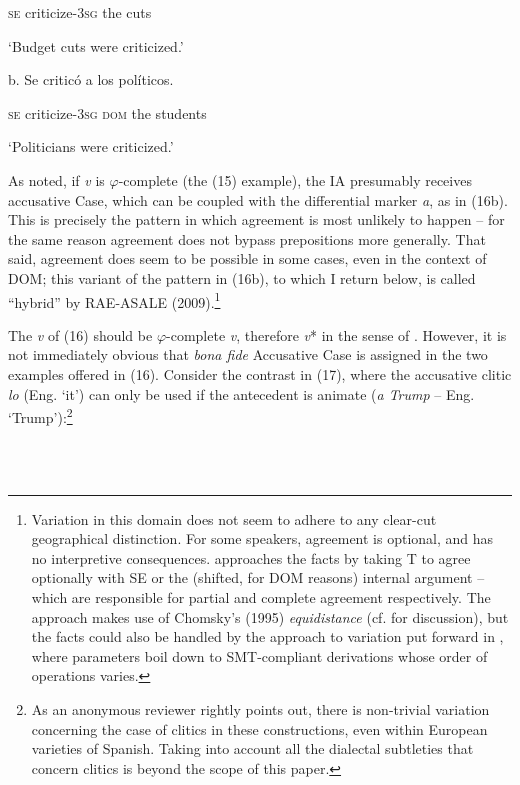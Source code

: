 \documentclass[output=paper]{langsci/langscibook}
\begin{document}
        \textsc{se} criticize\textsc{{}-3sg}  the  cuts

                 ‘Budget cuts were criticized.’

  b.   Se  criticó             a        los  políticos.             

      \textsc{se} criticize\textsc{{}-3sg  dom} the students

      ‘Politicians were criticized.’

As noted, if \textit{v} is $\varphi $-complete (the (15) example), the IA presumably receives accusative Case, which can be coupled with the differential marker \textit{a}, as in (16b). This is precisely the pattern in which agreement is most unlikely to happen – for the same reason agreement does not bypass prepositions more generally. That said, agreement does seem to be possible in some cases, even in the context of DOM; this variant of the pattern in (16b), to which I return below, is called “hybrid” by RAE-ASALE (2009).\footnote{Variation in this domain does not seem to adhere to any clear-cut geographical distinction. For some speakers, agreement is optional, and has no interpretive consequences. \citet{Planells2017} approaches the facts by taking T to agree optionally with SE or the (shifted, for DOM reasons) internal argument – which are responsible for partial and complete agreement respectively. The approach makes use of Chomsky’s (1995) \textit{equidistance} (cf. \citealt{Gallego2013} for discussion), but the facts could also be handled by the approach to variation put forward in \citet{Obata2016}, where parameters boil down to SMT-compliant derivations whose order of operations varies.}

  The \textit{v} of (16) should be $\varphi $-complete \textit{v}, therefore \textit{v}* in the sense of \citet{Chomsky2001}. However, it is not immediately obvious that \textit{bona fide} Accusative Case is assigned in the two examples offered in (16). Consider the contrast in (17), where the accusative clitic \textit{lo} (Eng. ‘it’) can only be used if the antecedent is animate (\textit{a Trump} – Eng. ‘Trump’):\footnote{As an anonymous reviewer rightly points out, there is non-trivial variation concerning the case of clitics in these constructions, even within European varieties of Spanish. Taking into account all the dialectal subtleties that concern clitics is beyond the scope of this paper.}

\ea%
    \label{ex:key:17}
    \gll\\
        \\
    \glt
    \z
\end{document}
